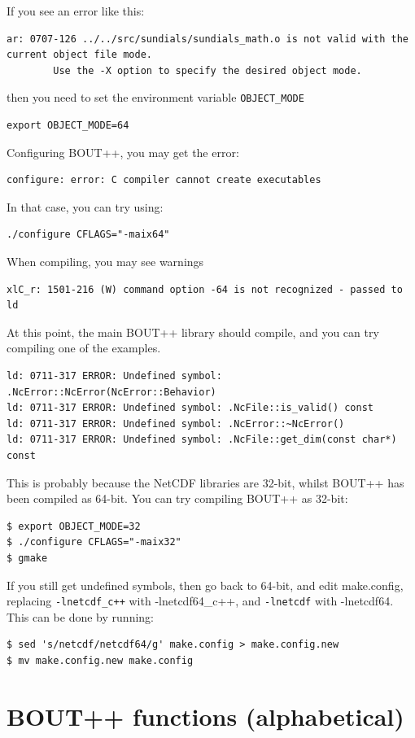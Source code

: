 \documentclass[12pt]{article}
\newcommand{\code}[1]{\texttt{#1}}
\begin{document}
If you see an error like this:
\begin{verbatim}
ar: 0707-126 ../../src/sundials/sundials_math.o is not valid with the current object file mode.
        Use the -X option to specify the desired object mode.
\end{verbatim}
then you need to set the environment variable \code{OBJECT\_MODE}
\begin{verbatim}
export OBJECT_MODE=64
\end{verbatim}

Configuring BOUT++, you may get the error:
\begin{verbatim}
configure: error: C compiler cannot create executables
\end{verbatim}
In that case, you can try using:
\begin{verbatim}
./configure CFLAGS="-maix64"
\end{verbatim}

When compiling, you may see warnings
\begin{verbatim}
xlC_r: 1501-216 (W) command option -64 is not recognized - passed to ld
\end{verbatim}

At this point, the main BOUT++ library should compile, and you can try
compiling one of the examples.

\begin{verbatim}
ld: 0711-317 ERROR: Undefined symbol: .NcError::NcError(NcError::Behavior)
ld: 0711-317 ERROR: Undefined symbol: .NcFile::is_valid() const
ld: 0711-317 ERROR: Undefined symbol: .NcError::~NcError()
ld: 0711-317 ERROR: Undefined symbol: .NcFile::get_dim(const char*) const
\end{verbatim}

This is probably because the NetCDF libraries are 32-bit, whilst BOUT++ has been compiled as 64-bit.
You can try compiling BOUT++ as 32-bit:
\begin{verbatim}
$ export OBJECT_MODE=32
$ ./configure CFLAGS="-maix32"
$ gmake
\end{verbatim}
If you still get undefined symbols, then go back to 64-bit, and edit
make.config, replacing
\code{-lnetcdf\_c++} with {-lnetcdf64\_c++}, and \code{-lnetcdf} with {-lnetcdf64}. This
can be done by running:
\begin{verbatim}
$ sed 's/netcdf/netcdf64/g' make.config > make.config.new
$ mv make.config.new make.config
\end{verbatim}

\section{BOUT++ functions (alphabetical)}
\end{document}
